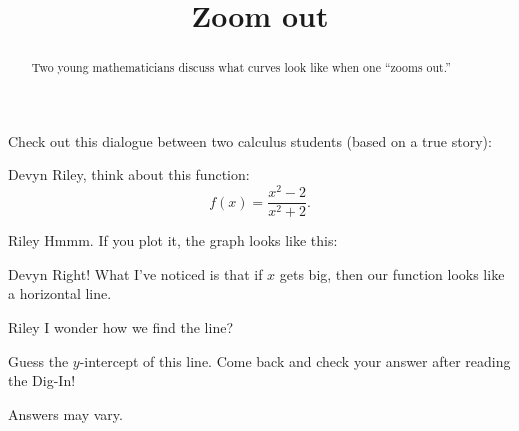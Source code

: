 \documentclass{ximera}
\title[Break-Ground:]{Zoom out}
\begin{document}
\begin{abstract}
Two young mathematicians discuss what curves look like when one
``zooms out.''
\end{abstract}
\maketitle

Check out this dialogue between two calculus students (based on a true
story):

\begin{dialogue}
\item[Devyn] Riley, think about this function:
  \[
  f(x) = \frac{x^2-2}{x^{2}+2}.
  \]
\item[Riley] Hmmm. If you plot it, the graph looks like this:
  \begin{image}
  \end{image}
\item[Devyn] Right! What I've noticed is that if $x$ gets big, then
  our function looks like a horizontal line.
\item[Riley] I wonder how we find the line? 
\end{dialogue}

\begin{problem}
   Guess the $y$-intercept of this line.  Come back and check your
   answer after reading the Dig-In!
   \begin{freeResponse}
   Answers may vary.
   \end{freeResponse}
\end{problem}



%
\end{document}
